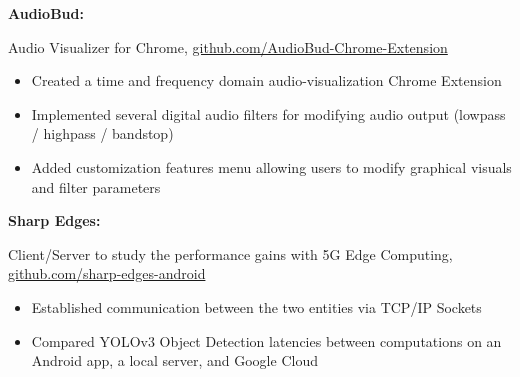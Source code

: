 \documentclass[letterpaper,10pt]{article}
\newcommand{\resumeItem}[2]{
  \item\normalsize{
    {#1}{#2 \vspace{-2pt}}
  }
}
\newcommand{\resumeSubItem}[2]{\resumeItem{#1}{#2}\vspace{-4pt}}
\begin{document}
{     \vspace{4pt}

      \resumeSubItem{\textbf{AudioBud: }}
      {Audio Visualizer for Chrome, \href{https://github.com/eric-delacruz-prod/AudioBud-Chrome-Extension}{github.com/AudioBud-Chrome-Extension}
         \vspace{-4pt}
         \begin{itemize}
            \item Created a time and frequency domain audio-visualization Chrome Extension 
            \vspace{-1pt}
            \item Implemented several digital audio filters for modifying audio output (lowpass / highpass / bandstop)
            \vspace{-1pt}
            \item Added customization features menu allowing users to modify graphical visuals and filter parameters
         \end{itemize}
      }

      \vspace{4pt}

      \resumeSubItem{\textbf{Sharp Edges: }}
      {Client/Server to study the performance gains with 5G Edge Computing, \href{https://github.com/erjseals/sharp-edges-android}{github.com/sharp-edges-android}
         \vspace{-4pt}
         \begin{itemize}
          \item Established communication between the two entities via TCP/IP Sockets 
          \vspace{-1pt}
          \item Compared YOLOv3 Object Detection latencies between computations on an Android app, a local server, and Google Cloud
         \end{itemize}
      }


}
\end{document}
